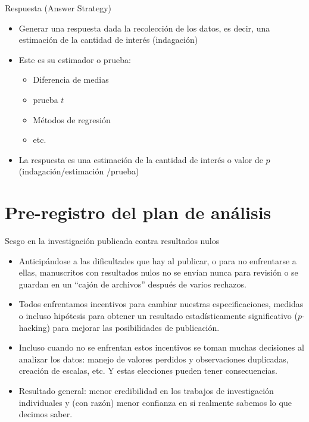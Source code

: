 \documentclass[
  ignorenonframetext,
]{beamer}
\begin{document}
\begin{frame}{Respuesta (Answer Strategy)}
\protect\hypertarget{respuesta-answer-strategy}{}
\begin{itemize}
\item
  Generar una respuesta dada la recolección de los datos, es decir, una
  estimación de la cantidad de interés (indagación)
\item
  Este es su estimador o prueba:

  \begin{itemize}
  \item
    Diferencia de medias
  \item
    prueba \(t\)
  \item
    Métodos de regresión
  \item
    etc.
  \end{itemize}
\item
  La respuesta es una estimación de la cantidad de interés o valor de
  \(p\) (indagación/estimación /prueba)
\end{itemize}
\end{frame}

\hypertarget{pre-registro-del-plan-de-anuxe1lisis}{%
\section{Pre-registro del plan de
análisis}\label{pre-registro-del-plan-de-anuxe1lisis}}

\begin{frame}{Sesgo en la investigación publicada contra resultados
nulos}
\protect\hypertarget{sesgo-en-la-investigaciuxf3n-publicada-contra-resultados-nulos}{}
\begin{itemize}
\item
  Anticipándose a las dificultades que hay al publicar, o para no
  enfrentarse a ellas, manuscritos con resultados nulos no se envían
  nunca para revisión o se guardan en un ``cajón de archivos'' después
  de varios rechazos.
\item
  Todos enfrentamos incentivos para cambiar nuestras especificaciones,
  medidas o incluso hipótesis para obtener un resultado estadísticamente
  significativo (\(p\)-hacking) para mejorar las posibilidades de
  publicación.
\item
  Incluso cuando no se enfrentan estos incentivos se toman muchas
  decisiones al analizar los datos: manejo de valores perdidos y
  observaciones duplicadas, creación de escalas, etc. Y estas elecciones
  pueden tener consecuencias.
\item
  Resultado general: menor credibilidad en los trabajos de investigación
  individuales y (con razón) menor confianza en si realmente sabemos lo
  que decimos saber.
\end{itemize}
\end{frame}
\end{document}
